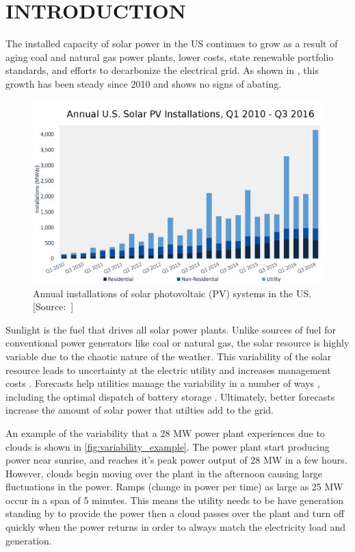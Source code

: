 \chapter{INTRODUCTION}
\label{chap:intro}

The installed capacity of solar power in the US continues to grow as a
result of aging coal and natural gas power plants, lower costs,
state renewable portfolio standards, and efforts to decarbonize the
electrical grid.
As shown in , this growth has been steady since
2010 and shows no signs of abating.

\begin{figure}[htb]
  \includegraphics[width=\textwidth]{figs/solar_installations.png}
  \caption[Annual installations of solar PV in the US]{Annual
    installations of solar photovoltaic (PV) systems in the
    US. [Source:~\cite{GTM/SEIA2016}]}
\label{fig:solarinstall}
\end{figure}

Sunlight is the fuel that drives all solar power plants.
Unlike sources of fuel for conventional power generators like coal or
natural gas, the solar resource is highly variable due to the chaotic
nature of the weather.
This variability of the solar resource leads to uncertainty at the
electric utility and increases management costs \citep{Joskow2011}.
Forecasts help utilities manage the variability in a number of ways
\citep{Kleissl2013,Inman2013}, including the optimal dispatch of
battery storage \citep{Cormode2015}.
Ultimately, better forecasts increase the amount of solar power that
utilties add to the grid.

An example of the variability that a 28 MW power plant experiences due
to clouds is shown in \cref{fig:variability_example}.
The power plant start producing power near sunrise, and reaches it's
peak power output of 28 MW in a few hours.
However, clouds begin moving over the plant in the afternoon causing
large fluctuations in the power.
Ramps (change in power per time) as large as 25 MW occur in a span of
5 minutes.
This means the utility needs to be have generation standing by to
provide the power then a cloud passes over the plant and turn off
quickly when the power returns in order to always match the
electricity load and generation.

